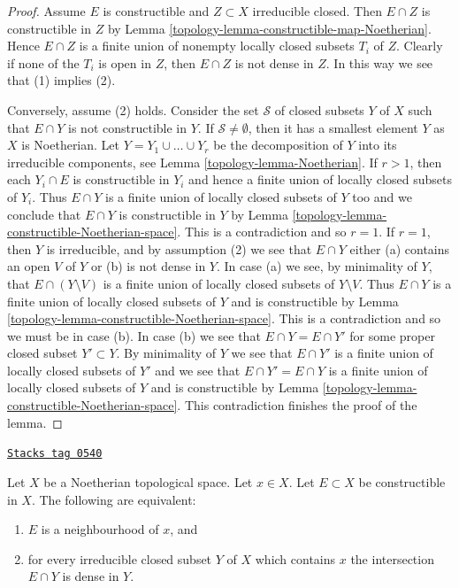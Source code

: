 \begin{proof}

Assume $E$ is constructible and $Z \subset X$ irreducible closed.
Then $E \cap Z$ is constructible in $Z$ by
Lemma \ref{topology-lemma-constructible-map-Noetherian}.
Hence $E \cap Z$ is a finite union of nonempty locally closed subsets
$T_i$ of $Z$. Clearly if none of the $T_i$ is open in $Z$, then
$E \cap Z$ is not dense in $Z$. In this way we see that (1) implies (2).

\medskip\noindent
Conversely, assume (2) holds. Consider the set $\mathcal{S}$ of closed
subsets $Y$ of $X$ such that $E \cap Y$ is not constructible in $Y$.
If $\mathcal{S} \not = \emptyset$, then it has a smallest element $Y$
as $X$ is Noetherian.
Let $Y = Y_1 \cup \ldots \cup Y_r$ be the decomposition of $Y$ into its
irreducible components, see
Lemma \ref{topology-lemma-Noetherian}.
If $r > 1$, then each $Y_i \cap E$ is constructible in $Y_i$ and hence
a finite union of locally closed subsets of $Y_i$. Thus $E \cap Y$
is a finite union of locally closed subsets of $Y$ too and we conclude
that $E \cap Y$ is constructible in $Y$ by
Lemma \ref{topology-lemma-constructible-Noetherian-space}.
This is a contradiction and so $r = 1$. If $r = 1$, then $Y$ is
irreducible, and by assumption (2) we see that $E \cap Y$ either
(a) contains an open $V$ of $Y$ or (b) is not dense in $Y$.
In case (a) we see, by minimality of $Y$, that $E \cap (Y \setminus V)$
is a finite union of locally closed subsets of $Y \setminus V$. Thus
$E \cap Y$ is a finite union of locally closed subsets of $Y$ and is
constructible by
Lemma \ref{topology-lemma-constructible-Noetherian-space}.
This is a contradiction and so we must be in case (b).
In case (b) we see that $E \cap Y = E \cap Y'$ for some proper closed
subset $Y' \subset Y$. By minimality of $Y$ we see that
$E \cap Y'$ is a finite union of locally closed subsets of $Y'$ and
we see that $E \cap Y' = E \cap Y$ is a finite union of locally closed
subsets of $Y$ and is constructible by
Lemma \ref{topology-lemma-constructible-Noetherian-space}.
This contradiction finishes the proof of the lemma.
\end{proof}

\begin{lemma}
\label{topology-lemma-constructible-neighbourhood-Noetherian}
\href{https://stacks.math.columbia.edu/tag/0540}{\texttt{Stacks tag 0540}}

Let $X$ be a Noetherian topological space.
Let $x \in X$.
Let $E \subset X$ be constructible in $X$.
The following are equivalent:
\begin{enumerate}
\item $E$ is a neighbourhood of $x$, and
\item for every irreducible closed subset $Y$ of $X$ which contains
$x$ the intersection $E \cap Y$ is dense in $Y$.
\end{enumerate}
\end{lemma}

